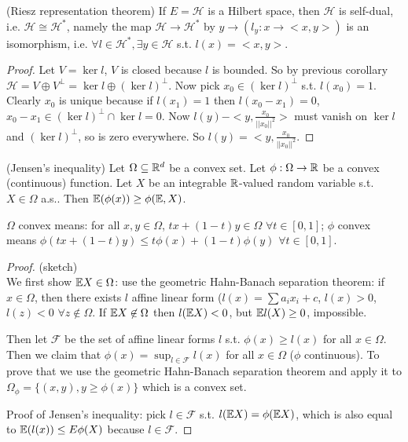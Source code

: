 \documentclass[a4paper]{article}
\begin{document}
\begin{prop} (Riesz representation theorem)
If $E = \mathcal{H}$ is a Hilbert space, then $\mathcal{H}$ is self-dual, i.e. $\mathcal{H} \cong \mathcal{H}^*$, namely the map $\mathcal{H} \to \mathcal{H}^*$ by $y \to (l_y:x \to <x,y>)$ is an isomorphism, i.e. $\forall l \in \mathcal{H}^*, \exists y \in \mathcal{H}$ s.t. $l(x) = <x,y>$.
\begin{proof}
Let $V=\ker l$, $V$ is closed because $l$ is bounded. So by previous corollary $\mathcal{H} = V \oplus V^\perp = \ker l \oplus (\ker l)^\perp$. Now pick $x_0 \in (\ker l)^\perp$ s.t. $l(x_0) = 1$. Clearly $x_0$ is unique because if $l(x_1) = 1$ then $l(x_0-x_1) =0$, $x_0-x_1 \in (\ker l)^\perp \cap \ker l = 0$. Now $l(y) - <y,\frac{x_0}{||x_0||^2}>$ must vanish on $\ker l$ and $(\ker l)^\perp$, so is zero everywhere. So $l(y) = <y,\frac{x_0}{||x_0||^2}$.
\end{proof}
\end{prop}

\begin{prop} (Jensen's inequality)
Let $\Omega \subseteq \mathbb{R}^d$ be a convex set. Let $\phi : \Omega \to \mathbb{R}$ be a convex (continuous) function. Let $X$ be an integrable $\mathbb{R}$-valued random variable s.t. $X \in \Omega$ a.s.. Then $\mathbb{E}(\phi(x)) \geq \phi(\mathbb{E},X)$.
\begin{rem}
$\Omega$ convex means: for all $x,y \in \Omega$, $tx + (1-t)y \in \Omega$ $\forall t \in [0,1]$; $\phi$ convex means $\phi(tx+(1-t)y) \leq t \phi(x) + (1-t) \phi(y)$ $\forall t \in [0,1]$.
\end{rem}
\begin{proof} (sketch)\\
We first show $\mathbb{E} X \in \Omega$: use the geometric Hahn-Banach separation theorem: if $x \in \Omega$, then there exists $l$ affine linear form ($l(x) = \sum a_i x_i + c$, $l(x) > 0$, $l(z) < 0$ $\forall z \not\in \Omega$. If $\mathbb{E} X \not\in \Omega$ then $l(\mathbb{E} X) < 0$, but $\mathbb{E} l(X) \geq 0$, impossible.

Then let $\mathcal{F}$ be the set of affine linear forms $l$ s.t. $\phi(x) \geq l(x)$ for all $x \in \Omega$. Then we claim that $\phi(x) = \sup_{l \in \mathcal{F}} l(x)$ for all $x \in \Omega$ ($\phi$ continuous). To prove that we use the geometric Hahn-Banach separation theorem and apply it to $\Omega_\phi = \{(x,y),y \geq \phi(x) \}$ which is a convex set.

Proof of Jensen's inequality: pick $l \in \mathcal{F}$ s.t. $l (\mathbb{E} X) = \phi(\mathbb{E} X)$, which is also equal to $\mathbb{E}(l(x)) \leq E \phi(X)$ because $l \in \mathcal{F}$.
\end{proof}
\end{prop}
\end{document}
